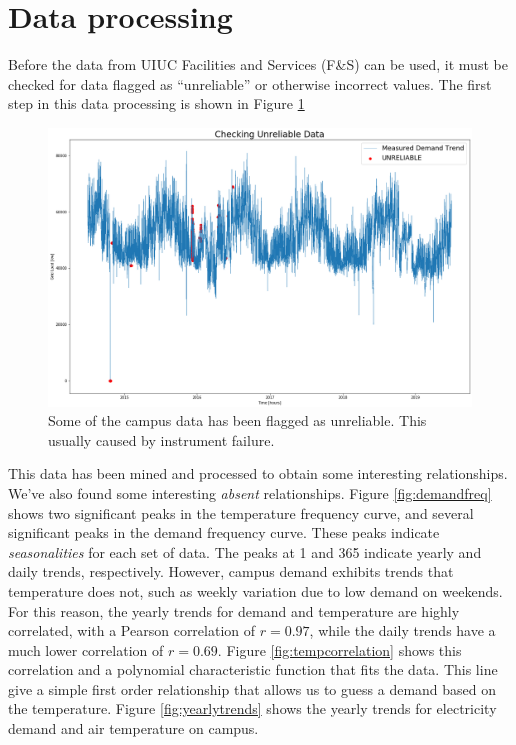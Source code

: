 \section{Data processing}
	Before the data from UIUC Facilities and Services (F\&S) can be used, it must
	be checked for data flagged as ``unreliable'' or otherwise incorrect values.
	The first step in this data processing is shown in Figure \ref{fig:unreliable}
	\begin{figure}[H]
	  \centering
	  \includegraphics[width=\textwidth]{./figures/unreliable.png}
	  \caption{Some of the campus data has been flagged as unreliable. This usually caused by instrument failure.}
	  \label{fig:unreliable}
	\end{figure}
	This data has been mined and processed to obtain some interesting relationships.
	We've also found some interesting \textit{absent} relationships. Figure \ref{fig:demandfreq} shows two significant peaks in the temperature frequency
	curve, and several significant peaks in the demand frequency curve. These peaks
	indicate \textit{seasonalities} for each set of data. The peaks at 1 and 365
	indicate yearly and daily trends, respectively. However, campus demand exhibits
	trends that temperature does not, such as weekly variation due to low demand
	on weekends. For this reason, the yearly trends for demand and temperature are
	highly correlated, with a Pearson correlation of $r=0.97$, while the daily trends have a much lower correlation of $r=0.69$. Figure \ref{fig:tempcorrelation} shows this correlation and a polynomial characteristic
	function that fits the data. This line give a simple first order relationship
	that allows us to guess a demand based on the temperature. Figure
	\ref{fig:yearlytrends} shows the yearly trends for electricity demand and air
	temperature on campus.

